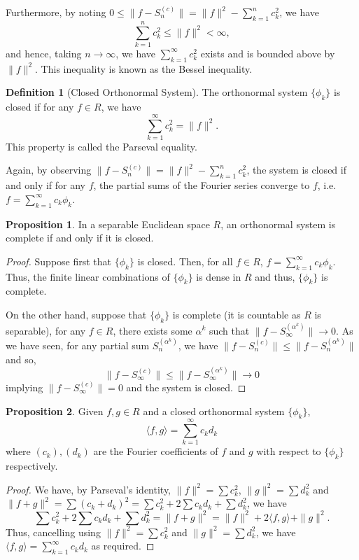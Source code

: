 \documentclass[]{article}
\theoremstyle{definition}
\theoremstyle{definition}
\newtheorem{definition}{Definition}[section]
\newtheorem{proposition}{Proposition}[section]
\begin{document}
Furthermore, by noting \(0 \le \|f - S_n^{(c)}\| = \|f\|^2 - \sum_{k = 1}^n c_k^2\), 
we have 
\[\sum_{k = 1}^n c_k^2 \le \|f\|^2 < \infty,\]
and hence, taking \(n \to \infty\), we have \(\sum_{k = 1}^\infty c_k^2\) exists 
and is bounded above by \(\|f\|^2\). This inequality is known as the Bessel inequality.

\begin{definition}[Closed Orthonormal System]
  The orthonormal system \(\{\phi_k\}\) is closed if for any \(f \in R\), we have 
  \[\sum_{k = 1}^\infty c_k^2 = \|f\|^2.\]
  This property is called the Parseval equality.
\end{definition}

Again, by observing \(\|f - S_n^{(c)}\| = \|f\|^2 - \sum_{k = 1}^n c_k^2\),
the system is closed if and only if for any \(f\), the partial sums of the 
Fourier series converge to \(f\), i.e. \(f = \sum_{k = 1}^\infty c_k \phi_k\).

\begin{proposition}
  In a separable Euclidean space \(R\), an orthonormal system is complete 
  if and only if it is closed.
\end{proposition}
\begin{proof}
  Suppose first that \(\{\phi_k\}\) is closed. Then, for all \(f \in R\), 
  \(f = \sum_{k = 1}^\infty c_k \phi_k\). Thus, the finite linear combinations of 
  \(\{\phi_k\}\) is dense in \(R\) and thus, \(\{\phi_k\}\) is complete.

  On the other hand, suppose that \(\{\phi_k\}\) is complete (it is countable 
  as \(R\) is separable), for any \(f \in R\), there exists some \(\alpha^k\) 
  such that \(\|f - S^{(\alpha^k)}_\infty\| \to 0\). As we have seen, for any partial 
  sum \(S^{(\alpha^k)}_n\), we have \(\|f - S^{(c)}_n\| \le \|f - S^{(\alpha^k)}_n\|\) 
  and so, 
  \[\|f - S^{(c)}_\infty\| \le \|f - S^{(\alpha^k)}_\infty\| \to 0\]
  implying \(\|f - S^{(c)}_\infty\| = 0\) and the system is closed.
\end{proof}


\begin{proposition}
  Given \(f, g \in R\) and a closed orthonormal system \(\{\phi_k\}\), 
  \[\langle f, g \rangle = \sum_{k = 1}^\infty c_k d_k\]
  where \((c_k), (d_k)\) are the Fourier coefficients of \(f\) and \(g\) with respect 
  to \(\{\phi_k\}\) respectively.
\end{proposition}
\begin{proof}
  We have, by Parseval's identity, \(\|f\|^2 = \sum c_k^2\), \(\|g\|^2 = \sum d_k^2\) 
  and \(\|f + g\|^2 = \sum (c_k + d_k)^2 = \sum c_k^2 + 2 \sum c_k d_k + \sum d_k^2\),
  we have 
  \[\sum c_k^2 + 2 \sum c_k d_k + \sum d_k^2 = \|f + g\|^2 = \|f\|^2 + 2\langle f, g\rangle + \|g\|^2.\]
  Thus, cancelling using \(\|f\|^2 = \sum c_k^2\) and \(\|g\|^2 = \sum d_k^2\), we have 
  \(\langle f, g \rangle = \sum_{k = 1}^\infty c_k d_k\) as required.
\end{proof}
\end{document}
